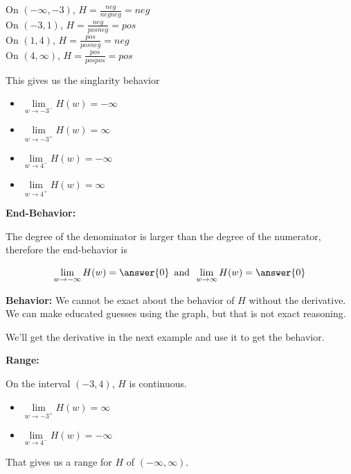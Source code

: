 \documentclass{ximera}
\begin{document}
\begin{example}
On $(-\infty, -3)$, $H = \frac{neg}{neg \dot neg} = neg$ \\
On $(-3, 1)$, $H = \frac{neg}{pos \dot neg} = pos$ \\
On $(1, 4)$, $H = \frac{pos}{pos \dot neg} = neg$ \\
On $(4, \infty)$, $H = \frac{pos}{pos \dot pos} = pos$ 


This gives us the singlarity behavior



\begin{itemize}
\item $\lim\limits_{w \to -3^-} H(w) = -\infty$
\item $\lim\limits_{w \to -3^+} H(w) = \infty$
\item $\lim\limits_{w \to 4^-} H(w) = -\infty$
\item $\lim\limits_{w \to 4^+} H(w) = \infty$
\end{itemize}














\textbf{End-Behavior:}


The degree of the denominator is larger than the degree of the numerator, therefore the end-behavior is



\[       \lim_{w \to -\infty} H(w) = \answer{0}   \, \text{ and } \,    \lim_{w \to \infty} H(w) = \answer{0}               \]








\textbf{Behavior:}  We cannot be exact about the behavior of $H$ without the derivative.  We can make educated guesses using the graph, but that is not exact reasoning.

We'll get the derivative in the next example and use it to get the behavior.









\textbf{Range:} 


On the interval $(-3, 4)$, $H$ is continuous.

\begin{itemize}
\item $\lim\limits_{w \to -3^+} H(w) = \infty$
\item $\lim\limits_{w \to 4^-} H(w) = -\infty$
\end{itemize}

That gives us a range for $H$ of $(-\infty, \infty )$.

\end{example}
\end{document}
